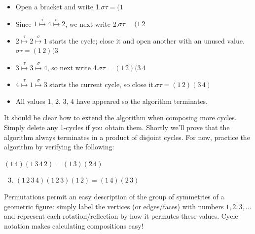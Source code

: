 \begin{itemize}\itemsep0pt
  \item Open a bracket and write 1.\hfill $\sigma\tau=(1\phantom{\,2)(3\,4)}$
  \item Since $1\overset{\tau}{\mapsto}4\overset{\sigma}{\mapsto}2$, we next write 2.\hfill $\sigma\tau=(1\,2\phantom{)(3\,4)}$
  \item $2\overset{\tau}{\mapsto}2\overset{\sigma}{\mapsto}1$ starts the cycle; close it and open another with an unused value.\hfill $\sigma\tau=(1\,2)(3\phantom{\,4)}$
  \item $3\overset{\tau}{\mapsto}3\overset{\sigma}{\mapsto}4$, so next write 4.\hfill $\sigma\tau=(1\,2)(3\,4\phantom{)}$
  \item $4\overset{\tau}{\mapsto}1\overset{\sigma}{\mapsto}3$ starts the current cycle, so close it.\hfill $\sigma\tau=(1\,2)(3\,4)$
  \item All values 1, 2, 3, 4 have appeared so the algorithm terminates.
\end{itemize}
It should be clear how to extend the algorithm when composing more cycles. Simply delete any 1-cycles if you obtain them. Shortly we'll prove that the algorithm always terminates in a product of disjoint cycles. For now, practice the algorithm by verifying the following:

\begin{examples}{}{}
	\exstart $(1\,4)(1\,3\,4\,2)=(1\,3)(2\,4)$\hfill {}
	\begin{enumerate}\setcounter{enumi}{2}
	  \item $(1\,2\,3\,4)(1\,2\,3)(1\,2)=(1\,4)(2\,3)$\hfill {}
	\end{enumerate}
\end{examples}


\goodbreak



Permutations permit an easy description of the group of symmetries of a geometric figure: simply label the vertices (or edges/faces) with numbers $1,2,3,\ldots$ and represent each rotation/reflection by how it permutes these values. Cycle notation makes calculating compositions easy!


